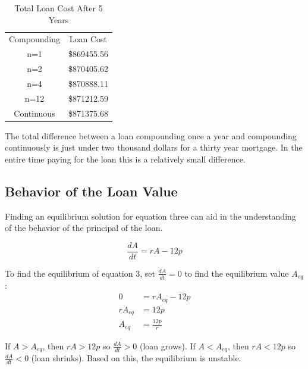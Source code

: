 \documentclass{article}
\numberwithin{figure}{section}
\begin{document}
    \begin{table}[H]
        \centering
        \begin{tabular}{cc}
            Compounding & Loan Cost\\
             n=1 &  \$869455.56\\
             n=2 & \$870405.62 \\
             n=4 & \$870888.11 \\
             n=12 & \$871212.59 \\
             Continuous & \$871375.68 \\
        \end{tabular}
        \caption{Total Loan Cost After 5 Years}
        \label{tab:placeholder}
    \end{table}

    The total difference between a loan compounding once a year and compounding continuously is just under two thousand dollars for a thirty year mortgage. In the entire time paying for the loan this is a relatively small difference. 

    \subsection{Behavior of the Loan Value}
    Finding an equilibrium solution for equation three can aid in the understanding of the behavior of the principal of the loan.

    \begin{equation*}
        \frac{dA}{dt} = rA - 12p
    \end{equation*}

    To find the equilibrium of equation 3, set $\frac{dA}{dt} = 0$ to find the equilibrium value $A_{eq}$:
    \begin{align*}
        0 &= rA_{eq} - 12p \\
        rA_{eq} &= 12p \\
        A_{eq} &= \frac{12p}{r}
    \end{align*}
    
    If $A > A_{eq}$, then $rA > 12p$ so $\frac{dA}{dt} > 0$ (loan grows).
    If $A < A_{eq}$, then $rA < 12p$ so $\frac{dA}{dt} < 0$ (loan shrinks).
    Based on this, the equilibrium is unstable.
    
\end{document}

